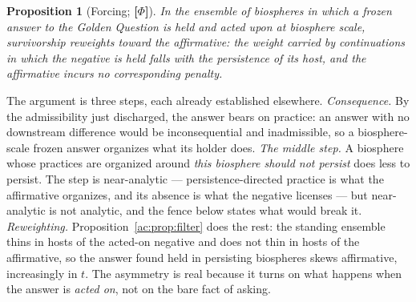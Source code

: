 \documentclass[11pt]{article}
\numberwithin{equation}{section}
\theoremstyle{plain}
\newtheorem{proposition}[theorem]{Proposition}
\theoremstyle{definition}
\theoremstyle{remark}
\begin{document}
\begin{proposition}[Forcing; \textbf{[$\Phi$]}]\label{ac:prop:forcing}
In the ensemble of biospheres in which a frozen answer to the Golden Question is held and acted upon at biosphere scale, survivorship reweights toward the affirmative: the weight carried by continuations in which the negative is held falls with the persistence of its host, and the affirmative incurs no corresponding penalty.
\end{proposition}

The argument is three steps, each already established elsewhere. \emph{Consequence.} By the admissibility just discharged, the answer bears on practice: an answer with no downstream difference would be inconsequential and inadmissible, so a biosphere-scale frozen answer organizes what its holder does. \emph{The middle step.} A biosphere whose practices are organized around \emph{this biosphere should not persist} does less to persist. The step is near-analytic --- persistence-directed practice is what the affirmative organizes, and its absence is what the negative licenses --- but near-analytic is not analytic, and the fence below states what would break it. \emph{Reweighting.} Proposition~\ref{ac:prop:filter} does the rest: the standing ensemble thins in hosts of the acted-on negative and does not thin in hosts of the affirmative, so the answer found held in persisting biospheres skews affirmative, increasingly in $t$. The asymmetry is real because it turns on what happens when the answer is \emph{acted on}, not on the bare fact of asking.
\end{document}
